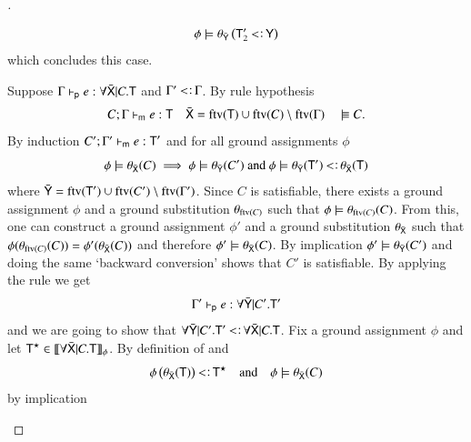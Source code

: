 \documentclass{report}
\begin{document}
\begin{proof}[]
\begin{indcase}{\sdapp}
\begin{displaymath}
        \phi\csat\theta_{\bar{\type{Y}}}\lrp{\type{T}_2'\subtype\type{Y}}
      \end{displaymath}
      which concludes this case.
    \end{indcase}
    \begin{indcase}{\sdfin}
      Suppose $\Gamma\vdash_\textsf{p} e:\forall\bar{\textsf{X}}|C.\textsf{T}$ and $\Gamma'\subtype\Gamma$.
      By rule hypothesis
      \begin{displaymath}
        C;\Gamma\entailsm e:\type{T} \quad
        \bar{\type{X}}=\ftv(\type{T})\cup\ftv(C)\setminus\ftv(\Gamma) \quad
        \cissat C\textrm{.}
      \end{displaymath}
      By induction $C';\Gamma'\vdash_\textsf{m} e:\textsf{T}'$ and for all ground assignments $\phi$
      \begin{displaymath}
        \phi\csat\theta_{\bar{\type{X}}}(C) \implies
        \phi\csat\theta_{\bar{\type{Y}}}(C')\textrm{ and }
        \phi\csat\theta_{\bar{\type{Y}}}(\type{T}')\subtype\theta_{\bar{\type{X}}}(\type{T})
      \end{displaymath}
      where $\bar{\textsf{Y}}=\mathop{\rm ftv}\nolimits(\textsf{T}')\cup\mathop{\rm ftv}\nolimits(C')\setminus\mathop{\rm ftv}\nolimits(\Gamma')$. Since $C$ is satisfiable,
      there exists a ground assignment $\phi$ and a ground substitution $\theta_{\mathop{\rm ftv}\nolimits(C)}$
      such that $\phi\models\theta_{\mathop{\rm ftv}\nolimits(C)}(C)$. From this, one can construct a ground assignment
      $\phi'$ and a ground substitution $\theta_{\bar{\textsf{X}}}$ such that
      $\phi(\theta_{\mathop{\rm ftv}\nolimits(C)}(C))=\phi'(\theta_{\bar{\textsf{X}}}(C))$ and therefore
      $\phi'\models\theta_{\bar{\textsf{X}}}(C)$.
      By implication $\phi'\models\theta_{\bar{\textsf{Y}}}(C')$ and doing the same
      `backward conversion' shows that $C'$ is satisfiable. By applying the \sdfin rule
      we get
      \begin{displaymath}
        \Gamma'\vdash_\textsf{p} e:\forall\bar{\textsf{Y}}|C'.\textsf{T}'
      \end{displaymath}
      and we are going to show that
      $\forall\bar{\type{Y}}|C'.\type{T}'\subtype\forall\bar{\type{X}}|C.\type{T}$. Fix
      a ground assignment $\phi$ and let $\textsf{T}^\star\in\llbracket{\forall\bar{\textsf{X}}|C.\textsf{T}}\rrbracket_{\phi}$.
      By definition of  and 
      \begin{displaymath}
        \phi\lrp{\theta_{\bar{\type{X}}}(\type{T})}\subtype\type{T}^\star\quad\textrm{and}\quad
        \phi\csat\theta_{\bar{\type{X}}}(C)
      \end{displaymath}
      by implication

\end{indcase}
\end{proof}
\end{document}
